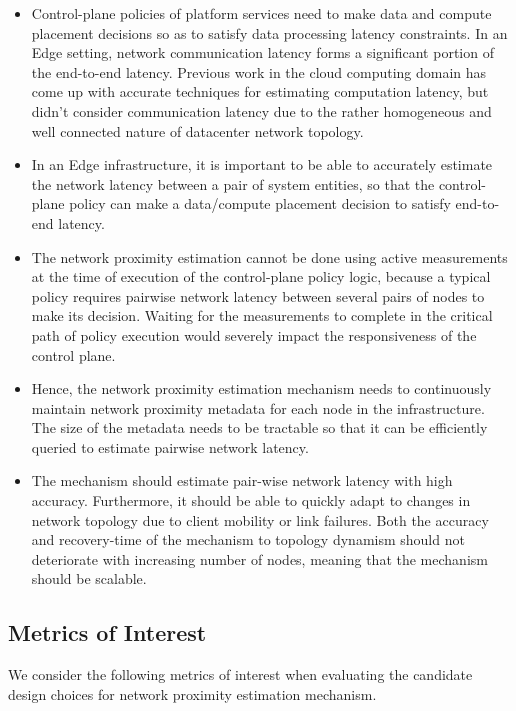 \begin{itemize}
\item Control-plane policies of platform services need to make data and compute placement decisions so as to satisfy data processing latency constraints. In an Edge setting, network communication latency forms a significant portion of the end-to-end latency. Previous work in the cloud computing domain has come up with accurate techniques for estimating computation latency, but didn't consider communication latency due to the rather homogeneous and well connected nature of datacenter network topology. 
\item In an Edge infrastructure, it is important to be able to accurately estimate the network latency between a pair of system entities, so that the control-plane policy can make a data/compute placement decision to satisfy end-to-end latency.
\item The network proximity estimation cannot be done using active measurements at the time of execution of the control-plane policy logic, because a typical policy requires pairwise network latency between several pairs of nodes to make its decision. Waiting for the measurements to complete in the critical path of policy execution would severely impact the responsiveness of the control plane.
\item Hence, the network proximity estimation mechanism needs to continuously maintain network proximity metadata for each node in the infrastructure. The size of the metadata needs to be tractable so that it can be efficiently queried to estimate pairwise network latency.
\item The mechanism should estimate pair-wise network latency with high accuracy. Furthermore, it should be able to quickly adapt to changes in network topology due to client mobility or link failures. Both the accuracy and recovery-time of the mechanism to topology dynamism should not deteriorate with increasing number of nodes, meaning that the mechanism should be scalable.
\end{itemize}

\subsection{Metrics of Interest}
We consider the following metrics of interest when evaluating the candidate design choices for network proximity estimation mechanism.

